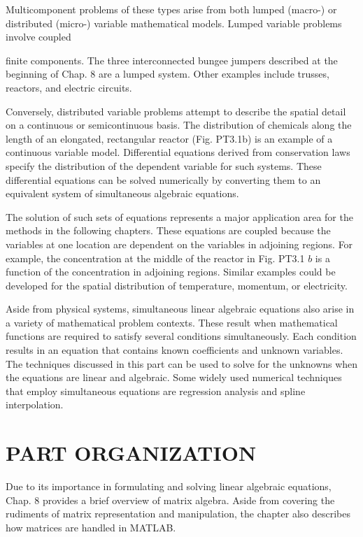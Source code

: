 \documentclass[../main.tex]{subfiles}
\begin{document}
Multicomponent problems of these types arise from both lumped (macro-) or distributed (micro-) variable mathematical models. Lumped variable problems involve coupled

finite components. The three interconnected bungee jumpers described at the beginning of Chap. 8 are a lumped system. Other examples include trusses, reactors, and electric circuits.

Conversely, distributed variable problems attempt to describe the spatial detail on a continuous or semicontinuous basis. The distribution of chemicals along the length of an elongated, rectangular reactor (Fig. PT3.1b) is an example of a continuous variable model. Differential equations derived from conservation laws specify the distribution of the dependent variable for such systems. These differential equations can be solved numerically by converting them to an equivalent system of simultaneous algebraic equations.

The solution of such sets of equations represents a major application area for the methods in the following chapters. These equations are coupled because the variables at one location are dependent on the variables in adjoining regions. For example, the concentration at the middle of the reactor in Fig. PT3.1 $b$ is a function of the concentration in adjoining regions. Similar examples could be developed for the spatial distribution of temperature, momentum, or electricity.

Aside from physical systems, simultaneous linear algebraic equations also arise in a variety of mathematical problem contexts. These result when mathematical functions are required to satisfy several conditions simultaneously. Each condition results in an equation that contains known coefficients and unknown variables. The techniques discussed in this part can be used to solve for the unknowns when the equations are linear and algebraic. Some widely used numerical techniques that employ simultaneous equations are regression analysis and spline interpolation.

\bigskip

\section[PART ORGANIZATION]{PART ORGANIZATION}

\noindent
Due to its importance in formulating and solving linear algebraic equations, Chap. 8 provides a brief overview of matrix algebra. Aside from covering the rudiments of matrix representation and manipulation, the chapter also describes how matrices are handled in MATLAB.
\end{document}
